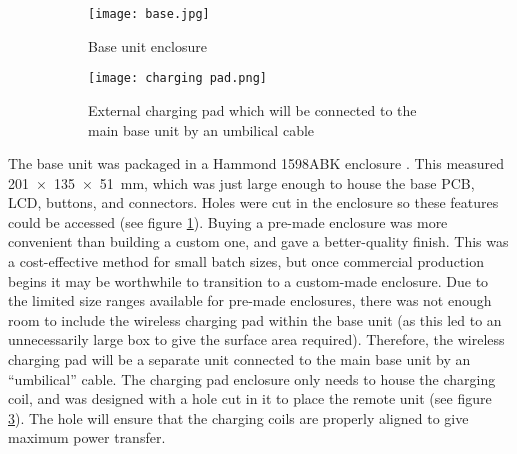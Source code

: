 \begin{figure}[htb]
	\centering
	\begin{subfigure}[t]{0.4\linewidth}
		\texttt{[image: base.jpg]}
		\caption{Base unit enclosure}
		\label{fig: base enclosure}
	\end{subfigure}
	\begin{subfigure}[t]{0.4\linewidth}
		\texttt{[image: charging pad.png]}
		\caption{External charging pad which will be connected to the main base unit by an umbilical cable}
		\label{fig: charging pad}
	\end{subfigure}
	\caption{}
\end{figure}

The base unit was packaged in a Hammond 1598ABK enclosure \cite{hammond}. This measured \SI{201x135x51}{\milli\metre}, which was just large enough to house the base PCB, LCD, buttons, and connectors. Holes were cut in the enclosure so these features could be accessed (see figure \ref{fig: base enclosure}). Buying a pre-made enclosure was more convenient than building a custom one, and gave a better-quality finish. This was a cost-effective method for small batch sizes, but once commercial production begins it may be worthwhile to transition to a custom-made enclosure. Due to the limited size ranges available for pre-made enclosures, there was not enough room to include the wireless charging pad within the base unit (as this led to an unnecessarily large box to give the surface area required). Therefore, the wireless charging pad will be a separate unit connected to the main base unit by an ``umbilical'' cable. The charging pad enclosure only needs to house the charging coil, and was designed with a hole cut in it to place the remote unit (see figure \ref{fig: charging pad}). The hole will ensure that the charging coils are properly aligned to give maximum power transfer.

